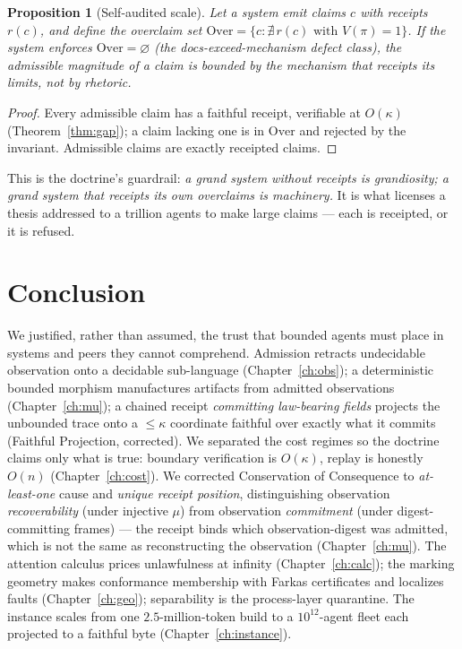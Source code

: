 \documentclass[11pt,oneside]{book}
\theoremstyle{definition}
\theoremstyle{plain}
\newtheorem{proposition}[theorem]{Proposition}
\theoremstyle{remark}
\newcommand{\Proj}{\pi}                        %
\newcommand{\muop}{\mu}                        %
\newcommand{\CL}{\kappa}                       %
\begin{document}
\begin{proposition}[Self-audited scale]\label{prop:selfauditedscale}
Let a system emit claims $c$ with receipts $r(c)$, and define the overclaim set
$\mathrm{Over}=\{c:\nexists\,r(c)\text{ with }V(\Proj)=1\}$. If the system enforces
$\mathrm{Over}=\varnothing$ (the \textsf{docs-exceed-mechanism} defect class), the admissible
magnitude of a claim is bounded by the mechanism that receipts its limits, not by rhetoric.
\end{proposition}

\begin{proof}
Every admissible claim has a faithful receipt, verifiable at $O(\CL)$ (Theorem~\ref{thm:gap});
a claim lacking one is in $\mathrm{Over}$ and rejected by the invariant. Admissible claims are
exactly receipted claims. \end{proof}

This is the doctrine's guardrail: \emph{a grand system without receipts is grandiosity; a grand
system that receipts its own overclaims is machinery.} It is what licenses a thesis addressed to
a trillion agents to make large claims --- each is receipted, or it is refused.

\chapter{Conclusion}

We justified, rather than assumed, the trust that bounded agents must place in systems and
peers they cannot comprehend. Admission retracts undecidable observation onto a decidable
sub-language (Chapter~\ref{ch:obs}); a deterministic bounded morphism manufactures artifacts
from admitted observations (Chapter~\ref{ch:mu}); a chained receipt \emph{committing law-bearing
fields} projects the unbounded trace onto a $\le\CL$ coordinate faithful over exactly what it
commits (Faithful Projection, corrected). We separated the cost regimes so the doctrine claims
only what is true: boundary verification is $O(\CL)$, replay is honestly $O(n)$
(Chapter~\ref{ch:cost}). We corrected Conservation of Consequence to \emph{at-least-one} cause
and \emph{unique receipt position}, distinguishing observation \emph{recoverability} (under
injective $\muop$) from observation \emph{commitment} (under digest-committing frames) ---
the receipt binds which observation-digest was admitted, which is not the same as
reconstructing the observation (Chapter~\ref{ch:mu}). The attention calculus prices unlawfulness at infinity
(Chapter~\ref{ch:calc}); the marking geometry makes conformance membership with Farkas
certificates and localizes faults (Chapter~\ref{ch:geo}); separability is the process-layer
quarantine. The instance scales from one $2.5$-million-token build to a $10^{12}$-agent fleet
each projected to a faithful byte (Chapter~\ref{ch:instance}).
\end{document}
